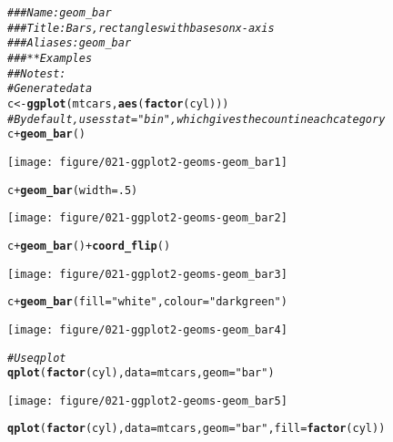 \documentclass[a4paper,titlepage]{tufte-handout}\usepackage[]{graphicx}\usepackage[]{color}
\makeatletter
\def\maxwidth{ %
  \ifdim\Gin@nat@width>\linewidth
    \linewidth
  \else
    \Gin@nat@width
  \fi
}
\newcommand{\hlnum}[1]{\textcolor[rgb]{0.686,0.059,0.569}{#1}}%
\newcommand{\hlstr}[1]{\textcolor[rgb]{0.192,0.494,0.8}{#1}}%
\newcommand{\hlcom}[1]{\textcolor[rgb]{0.678,0.584,0.686}{\textit{#1}}}%
\newcommand{\hlopt}[1]{\textcolor[rgb]{0,0,0}{#1}}%
\newcommand{\hlstd}[1]{\textcolor[rgb]{0.345,0.345,0.345}{#1}}%
\newcommand{\hlkwb}[1]{\textcolor[rgb]{0.69,0.353,0.396}{#1}}%
\newcommand{\hlkwc}[1]{\textcolor[rgb]{0.333,0.667,0.333}{#1}}%
\newcommand{\hlkwd}[1]{\textcolor[rgb]{0.737,0.353,0.396}{\textbf{#1}}}%
\newenvironment{kframe}{%
 \def\at@end@of@kframe{}%
 \ifinner\ifhmode%
  \def\at@end@of@kframe{\end{minipage}}%
  \begin{minipage}{\columnwidth}%
 \fi\fi%
 \def\FrameCommand##1{\hskip\@totalleftmargin \hskip-\fboxsep
 \colorbox{shadecolor}{##1}\hskip-\fboxsep
     \hskip-\linewidth \hskip-\@totalleftmargin \hskip\columnwidth}%
 \MakeFramed {\advance\hsize-\width
   \@totalleftmargin\z@ \linewidth\hsize
   \@setminipage}}%
 {\par\unskip\endMakeFramed%
 \at@end@of@kframe}
\newenvironment{knitrout}{}{} %
\makeatother
\begin{document}
\begin{knitrout}
\color{fgcolor}\begin{kframe}
\begin{alltt}
\hlcom{### Name: geom_bar}
\hlcom{### Title: Bars, rectangles with bases on x-axis}
\hlcom{### Aliases: geom_bar}
\hlcom{### ** Examples}
\hlcom{## No test: }
\hlcom{# Generate data}
\hlstd{c} \hlkwb{<-} \hlkwd{ggplot}\hlstd{(mtcars,} \hlkwd{aes}\hlstd{(}\hlkwd{factor}\hlstd{(cyl)))}
\hlcom{# By default, uses stat="bin", which gives the count in each category}
\hlstd{c} \hlopt{+} \hlkwd{geom_bar}\hlstd{()}
\end{alltt}
\end{kframe}
\texttt{[image: figure/021-ggplot2-geoms-geom\_bar1]} 
\begin{kframe}\begin{alltt}
\hlstd{c} \hlopt{+} \hlkwd{geom_bar}\hlstd{(}\hlkwc{width}\hlstd{=}\hlnum{.5}\hlstd{)}
\end{alltt}
\end{kframe}
\texttt{[image: figure/021-ggplot2-geoms-geom\_bar2]} 
\begin{kframe}\begin{alltt}
\hlstd{c} \hlopt{+} \hlkwd{geom_bar}\hlstd{()} \hlopt{+} \hlkwd{coord_flip}\hlstd{()}
\end{alltt}
\end{kframe}
\texttt{[image: figure/021-ggplot2-geoms-geom\_bar3]} 
\begin{kframe}\begin{alltt}
\hlstd{c} \hlopt{+} \hlkwd{geom_bar}\hlstd{(}\hlkwc{fill}\hlstd{=}\hlstr{"white"}\hlstd{,} \hlkwc{colour}\hlstd{=}\hlstr{"darkgreen"}\hlstd{)}
\end{alltt}
\end{kframe}
\texttt{[image: figure/021-ggplot2-geoms-geom\_bar4]} 
\begin{kframe}\begin{alltt}
\hlcom{# Use qplot}
\hlkwd{qplot}\hlstd{(}\hlkwd{factor}\hlstd{(cyl),} \hlkwc{data}\hlstd{=mtcars,} \hlkwc{geom}\hlstd{=}\hlstr{"bar"}\hlstd{)}
\end{alltt}
\end{kframe}
\texttt{[image: figure/021-ggplot2-geoms-geom\_bar5]} 
\begin{kframe}\begin{alltt}
\hlkwd{qplot}\hlstd{(}\hlkwd{factor}\hlstd{(cyl),} \hlkwc{data}\hlstd{=mtcars,} \hlkwc{geom}\hlstd{=}\hlstr{"bar"}\hlstd{,} \hlkwc{fill}\hlstd{=}\hlkwd{factor}\hlstd{(cyl))}

\end{alltt}
\end{kframe}
\end{knitrout}
\end{document}
